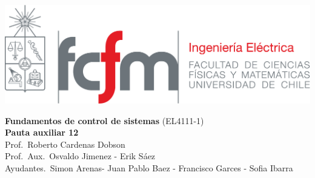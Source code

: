 \documentclass[
  11pt,
  letterpaper,
   addpoints,
   answers
  ]{exam}
\begin{document}
\noindent
\begin{minipage}{0.47\textwidth}
\includegraphics[width=\textwidth]{../fcfm_die}
\end{minipage}
\begin{minipage}{0.53\textwidth}
\begin{center} 
\large\textbf{Fundamentos de control de sistemas} (EL4111-1) \\
\large\textbf{Pauta auxiliar 12} \\
\small Prof.~Roberto Cardenas Dobson\\
\small Prof.~Aux.~Osvaldo Jimenez - Erik Sáez\\
\small Ayudantes.~Simon Arenas- Juan Pablo Baez - Francisco Garces - Sofia Ibarra\\
\end{center}
\end{minipage}
\end{document}
